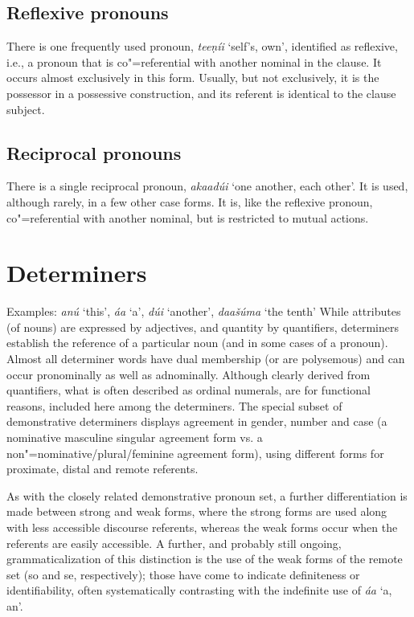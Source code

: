 \subsection{Reflexive pronouns}
\label{subsec:3b-6-4}
There is one frequently used pronoun, \textit{teeṇíi} `self’s, own', identified as reflexive, i.e., a pronoun that is co"=referential with another nominal in the clause. It occurs almost exclusively in this form. Usually, but not exclusively, it is the possessor in a possessive construction, and its referent is identical to the clause subject.


\subsection{Reciprocal pronouns}
\label{subsec:3b-6-5}
There is a single reciprocal pronoun, \textit{akaadúi} `one another, each other'. It is used, although rarely, in a few other case forms. It is, like the reflexive pronoun, co"=referential with another nominal, but is restricted to mutual actions.


\section{Determiners}
\label{sec:3b-7}
Examples: \textit{anú} `this', \textit{áa} `a', \textit{dúi} `another', \textit{daašúma} `the tenth'
While attributes (of nouns) are expressed by adjectives, and quantity by quantifiers, determiners establish the reference of a particular noun (and in some cases of a pronoun). Almost all determiner words have dual membership (or are polysemous) and can occur pronominally as well as adnominally. Although clearly derived from quantifiers, what is often described as ordinal numerals, are for functional reasons, included here among the determiners. The special subset of demonstrative determiners displays agreement in gender, number and case (a nominative masculine singular agreement form vs. a non"=nominative/plural/feminine agreement form), using different forms for proximate, distal and remote referents.


As with the closely related demonstrative pronoun set, a further differentiation is made between strong and weak forms, where the strong forms are used along with less accessible discourse referents, whereas the weak forms occur when the referents are easily accessible. A further, and probably still ongoing, grammaticalization of this distinction is the use of the weak forms of the remote set (so and se, respectively); those have come to indicate definiteness or identifiability, often systematically contrasting with the indefinite use of \textit{áa} `a, an'.


